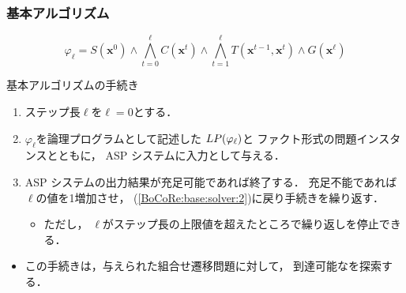 \documentclass[dvipdfmx,11pt]{beamer}
\begin{document}
\begin{frame}
  \frametitle{基本アルゴリズム}

  \[
    \varphi_{\ell} = S(\bm{x}^0)  
    \land \bigwedge_{t=0}^{\ell} C(\bm{x}^t) 
    \land \bigwedge_{t=1}^{\ell} T(\bm{x}^{t-1},\bm{x}^{t}) 
    \land G(\bm{x}^\ell)  
  \]

\begin{block}{基本アルゴリズムの手続き}
\begin{enumerate}
\item ステップ長$\ell$を$\ell=0$とする．
\item \label{BoCoRe:base:solver:2}
  $\varphi_\ell$を論理プログラムとして記述した
  $LP(\varphi_\ell)$と
  ファクト形式の問題インスタンスとともに，
  ASP システムに入力として与える．
\item ASP システムの出力結果が充足可能であれば終了する．
  充足不能であれば$\ell$の値を1増加させ，
  (\ref{BoCoRe:base:solver:2})に戻り手続きを繰り返す．
  \begin{itemize}
    \item ただし，
      $\ell$がステップ長の上限値を超えたところで繰り返しを停止できる．
  \end{itemize}
\end{enumerate}
\end{block}

\begin{itemize}
\item この手続きは，与えられた組合せ遷移問題に対して，
 到達可能なを探索する．
\end{itemize}
\end{frame}
\end{document}
